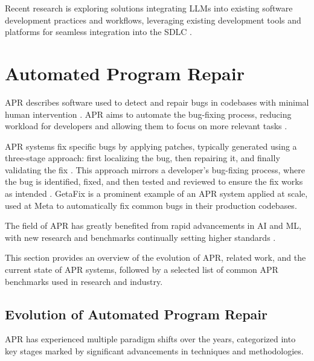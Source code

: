 Recent research is exploring solutions integrating \acp{LLM} into existing software development practices and workflows, leveraging existing development tools and platforms for seamless integration into the \ac{SDLC} \cite{puvvadiCodingAgentsComprehensive2025, dohmkeGitHubCopilotMeet2025, IntroducingCodex, sauvolaFutureSoftwareDevelopment2024}.

\section{Automated Program Repair}

\acf{APR} describes software used to detect and repair bugs in codebases with minimal human intervention \cite{zhangSurveyLearningbasedAutomated2024}. APR aims to automate the bug-fixing process, reducing workload for developers and allowing them to focus on more relevant tasks \cite{houLargeLanguageModels2024}.

APR systems fix specific bugs by applying patches, typically generated using a three-stage approach: first localizing the bug, then repairing it, and finally validating the fix \cite{zhangSurveyLearningbasedAutomated2024, baderGetafixLearningFix2019}. This approach mirrors a developer's bug-fixing process, where the bug is identified, fixed, and then tested and reviewed to ensure the fix works as intended \cite{yangSWEagentAgentComputerInterfaces2024}. GetaFix \cite{baderGetafixLearningFix2019} is a prominent example of an APR system applied at scale, used at Meta to automatically fix common bugs in their production codebases.

The field of APR has greatly benefited from rapid advancements in AI and ML, with new research and benchmarks continually setting higher standards \cite{puvvadiCodingAgentsComprehensive2025, houLargeLanguageModels2024}.

This section provides an overview of the evolution of APR, related work, and the current state of APR systems, followed by a selected list of common APR benchmarks used in research and industry.

\subsection{Evolution of Automated Program Repair} \label{subsection:evolution-apr}

\ac{APR} has experienced multiple paradigm shifts over the years, categorized into key stages marked by significant advancements in techniques and methodologies.

